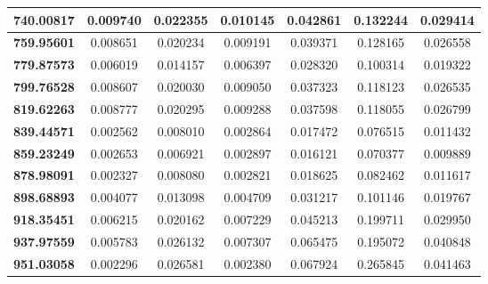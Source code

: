 \documentclass[11pt]{article}
\begin{document}
\begin{appendices}
\begin{table}[htbp]
\begin{center}
\begin{tabular}{|c|c|c|c|c|c|c|}
		\textbf{740.00817} & 0.009740 & 0.022355 & 0.010145 & 0.042861 & 0.132244 & 0.029414 \\ \hline
		\textbf{759.95601} & 0.008651 & 0.020234 & 0.009191 & 0.039371 & 0.128165 & 0.026558 \\ \hline
		\textbf{779.87573} & 0.006019 & 0.014157 & 0.006397 & 0.028320 & 0.100314 & 0.019322 \\ \hline
		\textbf{799.76528} & 0.008607 & 0.020030 & 0.009050 & 0.037323 & 0.118123 & 0.026535 \\ \hline
		\textbf{819.62263} & 0.008777 & 0.020295 & 0.009288 & 0.037598 & 0.118055 & 0.026799 \\ \hline
		\textbf{839.44571} & 0.002562 & 0.008010 & 0.002864 & 0.017472 & 0.076515 & 0.011432 \\ \hline
		\textbf{859.23249} & 0.002653 & 0.006921 & 0.002897 & 0.016121 & 0.070377 & 0.009889 \\ \hline
		\textbf{878.98091} & 0.002327 & 0.008080 & 0.002821 & 0.018625 & 0.082462 & 0.011617 \\ \hline
		\textbf{898.68893} & 0.004077 & 0.013098 & 0.004709 & 0.031217 & 0.101146 & 0.019767 \\ \hline
		\textbf{918.35451} & 0.006215 & 0.020162 & 0.007229 & 0.045213 & 0.199711 & 0.029950 \\ \hline
		\textbf{937.97559} & 0.005783 & 0.026132 & 0.007307 & 0.065475 & 0.195072 & 0.040848 \\ \hline
		\textbf{951.03058} & 0.002296 & 0.026581 & 0.002380 & 0.067924 & 0.265845 & 0.041463 \\ \hline
	\end{tabular}
	\end{center}
\end{table}


\end{appendices}
\end{document}
